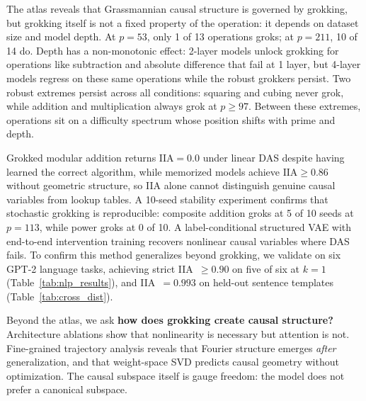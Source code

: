\documentclass{article}
\newcommand{\IIA}{\mathrm{IIA}}
\begin{document}
The atlas reveals that Grassmannian causal structure is governed by grokking,
but grokking itself is not a fixed property of the operation: it depends on
dataset size and model depth. At $p{=}53$, only 1 of 13 operations groks; at
$p{=}211$, 10 of 14 do. Depth has a non-monotonic effect: 2-layer models
unlock grokking for operations like subtraction and absolute difference that
fail at 1 layer, but 4-layer models regress on these same operations while
the robust grokkers persist. Two robust
extremes persist across all conditions: squaring and cubing never grok, while
addition and multiplication always grok at $p \geq 97$. Between these
extremes, operations sit on a difficulty spectrum whose position shifts with
prime and depth.

Grokked modular addition returns $\IIA = 0.0$ under linear DAS despite having
learned the correct algorithm, while memorized models achieve $\IIA \geq 0.86$ without geometric structure, so
IIA alone cannot distinguish genuine causal variables from lookup tables.
A 10-seed stability experiment confirms that stochastic grokking is
reproducible: composite addition groks at 5 of 10 seeds at $p{=}113$,
while power groks at 0 of 10. A label-conditional structured VAE with end-to-end
intervention training recovers nonlinear causal variables where DAS fails.
To confirm this method generalizes beyond grokking, we validate on six
GPT-2 language tasks, achieving strict IIA~$\geq 0.90$ on five of six at
$k{=}1$ (Table~\ref{tab:nlp_results}), and IIA~$= 0.993$ on held-out
sentence templates (Table~\ref{tab:cross_dist}).

Beyond the atlas, we ask \textbf{how does grokking create causal structure?}
Architecture ablations show that nonlinearity is necessary but attention is
not. Fine-grained trajectory analysis reveals that Fourier structure emerges
\emph{after} generalization, and that weight-space SVD predicts causal
geometry without optimization. The causal subspace itself is gauge freedom: the model does not prefer a
canonical subspace.
\end{document}
